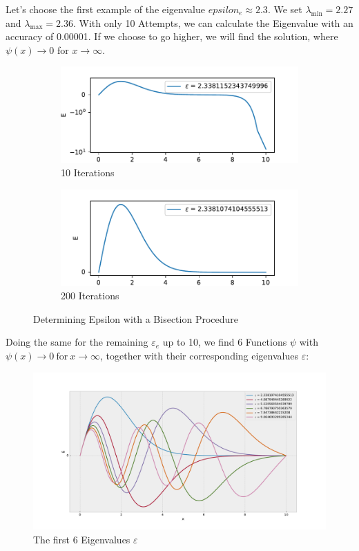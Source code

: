 \documentclass{article}
\begin{document}
Let's choose the first example of the eigenvalue \( epsilon_e \approx 2.3 \).
We set \( \lambda_\text{min} = 2.27 \) and \( \lambda_\text{max} = 2.36 \).
With only 10 Attempts, we can calculate the Eigenvalue with an accuracy of
0.00001. If we choose to go higher, we will find the solution, where
\( \psi (x) \rightarrow 0 \) for \( x \rightarrow \infty \).
\begin{figure}[H]
    \centering
    \begin{subfigure}{.49\textwidth}
	\includegraphics[width=\textwidth]{Eigenvalue_10.pdf} 
	\caption{10 Iterations} 
    \end{subfigure}	
    \begin{subfigure}{.49\textwidth}
	\includegraphics[width=\textwidth]{Eigenvalue_200.pdf} 
	\caption{200 Iterations} 
    \end{subfigure}	
    \caption{Determining Epsilon with a Bisection Procedure}
\end{figure}
Doing the same for the remaining \( \varepsilon _e \) up to 10, we find 6
Functions \( \psi \) with \\ \( \psi (x) \rightarrow 0 \ \text{for} \ 
x \rightarrow \infty\), together with their corresponding eigenvalues
\( \varepsilon \):
\begin{figure}[ht]
    \centering
    \includegraphics[width=\textwidth]{Eigenvalues.pdf} 
    \caption{The first 6 Eigenvalues $\varepsilon$} 
\end{figure}
\end{document}
